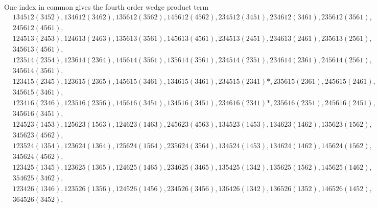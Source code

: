 \documentclass[aps, preprint]{revtex4}
\begin{document}
One index in common gives the fourth order wedge product term
\begin{align*} & 134512 \left (3452\right ) ,134612 \left (3462\right ) ,135612 \left (3562\right ) ,145612 \left (4562\right ) ,234512 \left (3451\right ) ,234612 \left (3461\right ) ,235612 \left (3561\right )\text{,} \\
 & 245612 \left (4561\right )\text{,} \\
 & 124513 \left (2453\right ) ,124613 \left (2463\right ) ,135613 \left (3561\right ) ,145613 \left (4561\right ) ,234513 \left (2451\right ) ,234613 \left (2461\right ) ,235613 \left (2561\right )\text{,} \\
 & 345613 \left (4561\right )\text{,} \\
 & 123514 \left (2354\right ) ,123614 \left (2364\right ) ,145614 \left (3561\right ) ,135614 \left (3561\right ) ,234514 \left (2351\right ) ,234614 \left (2361\right ) ,245614 \left (2561\right )\text{,} \\
 & 345614 \left (3561\right )\text{,} \\
 & 123415 \left (2345\right ) ,123615 \left (2365\right ) ,145615 \left (3461\right ) ,134615 \left (3461\right ) ,234515 \left (2341\right ) \ast  , 235615 \left (2361\right ) ,245615 \left (2461\right )\text{,} \\
 & 345615 \left (3461\right )\text{,} \\
 & 123416 \left (2346\right ) ,123516 \left (2356\right ) ,145616 \left (3451\right ) ,134516 \left (3451\right ) ,234616 \left (2341\right ) \ast  , 235616 \left (2351\right ) ,245616 \left (2451\right )\text{,} \\
 & 345616 \left (3451\right )\text{,}\end{align*}
\begin{align*} & 124523 \left (1453\right ) ,125623 \left (1563\right ) ,124623 \left (1463\right ) ,245623 \left (4563\right ) ,134523 \left (1453\right ) ,134623 \left (1462\right ) ,135623 \left (1562\right )\text{,} \\
 & 345623 \left (4562\right )\text{,} \\
 & 123524 \left (1354\right ) ,123624 \left (1364\right ) ,125624 \left (1564\right ) ,235624 \left (3564\right ) ,134524 \left (1453\right ) ,134624 \left (1462\right ) ,145624 \left (1562\right )\text{,} \\
 & 345624 \left (4562\right )\text{,} \\
 & 123425 \left (1345\right ) ,123625 \left (1365\right ) ,124625 \left (1465\right ) ,234625 \left (3465\right ) ,135425 \left (1342\right ) ,135625 \left (1562\right ) ,145625 \left (1462\right )\text{,} \\
 & 354625 \left (3462\right )\text{,} \\
 & 123426 \left (1346\right ) ,123526 \left (1356\right ) ,124526 \left (1456\right ) ,234526 \left (3456\right ) ,136426 \left (1342\right ) ,136526 \left (1352\right ) ,146526 \left (1452\right )\text{,} \\
 & 364526 \left (3452\right )\text{,}\end{align*}
\end{document}
